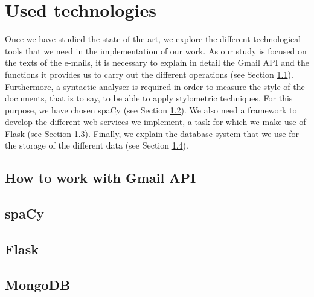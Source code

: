 \chapter{Used technologies}
\label{cap:usedtech}


Once we have studied the state of the art, we explore the different technological tools that we need in the implementation of our work. As our study is focused on the texts of the e-mails, it is necessary to explain in detail the Gmail API and the functions it provides us to carry out the different operations (see Section \ref{sect:gmailapitech}). Furthermore, a syntactic analyser is required in order to measure the style of the documents, that is to say, to be able to apply stylometric techniques. For this purpose, we have chosen spaCy (see Section \ref{sect:spacy}). We also need a framework to develop the different web services we implement, a task for which we make use of Flask (see Section \ref{sect:flask}). Finally, we explain the database system that we use for the storage of the different data (see Section \ref{sect:mongo}).

\section{How to work with Gmail API}\label{sect:gmailapitech}


\section{spaCy}\label{sect:spacy}


\section{Flask}\label{sect:flask}


\section{MongoDB}\label{sect:mongo}


